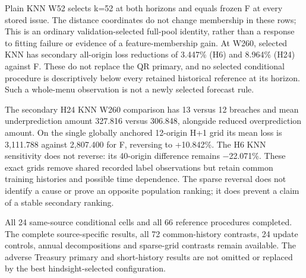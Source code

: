 \documentclass[10pt,a4paper]{article}
\begin{document}
Plain KNN W52 selects k=52 at both horizons and equals frozen F at every stored issue. The distance coordinates do not change membership in these rows; This is an ordinary validation-selected full-pool identity, rather than a response to fitting failure or evidence of a feature-membership gain. At W260, selected KNN has secondary all-origin loss reductions of 3.447\% (H6) and 8.964\% (H24) against F. These do not replace the QR primary, and no selected conditional procedure is descriptively below every retained historical reference at its horizon. Such a whole-menu observation is not a newly selected forecast rule.

The secondary H24 KNN W260 comparison has 13 versus 12 breaches and mean underprediction amount 327.816 versus 306.848, alongside reduced overprediction amount. On the single globally anchored 12-origin H+1 grid its mean loss is 3,111.788 against 2,807.400 for F, reversing to +10.842\%. The H6 KNN sensitivity does not reverse: its 40-origin difference remains \(-\)22.071\%. These exact grids remove shared recorded label observations but retain common training histories and possible time dependence. The sparse reversal does not identify a cause or prove an opposite population ranking; it does prevent a claim of a stable secondary ranking.

All 24 same-source conditional cells and all 66 reference procedures completed. The complete source-specific results, all 72 common-history contrasts, 24 update controls, annual decompositions and sparse-grid contrasts remain available. The adverse Treasury primary and short-history results are not omitted or replaced by the best hindsight-selected configuration.
\end{document}
